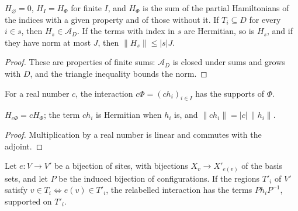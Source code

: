 \begin{lemma}
    \label{lem:dynamics_partial_hamiltonian}
    \leanok
    $H_\varnothing=0$, $H_I=H_\Phi$ for finite $I$, and $H_\Phi$ is the sum of the
    partial Hamiltonians of the indices with a given property and of those without it.
    If $T_i\subseteq D$ for every $i\in s$, then $H_s\in\mathcal A_D$. If the terms
    with index in $s$ are Hermitian, so is $H_s$, and if they have norm at most $J$,
    then $\lVert H_s\rVert\le\lvert s\rvert J$.
\end{lemma}
\begin{proof}
    \leanok
    These are properties of finite sums: $\mathcal A_D$ is closed under sums and grows
    with $D$, and the triangle inequality bounds the norm.
\end{proof}

\begin{definition}
    \label{def:dynamics_interaction_smul}
    \leanok
    For a real number $c$, the interaction $c\Phi=(ch_i)_{i\in I}$ has the supports of
    $\Phi$.
\end{definition}

\begin{lemma}
    \label{lem:dynamics_interaction_smul}
    \leanok
    $H_{c\Phi}=cH_\Phi$; the term $ch_i$ is Hermitian when $h_i$ is, and
    $\lVert ch_i\rVert=\lvert c\rvert\,\lVert h_i\rVert$.
\end{lemma}
\begin{proof}
    \leanok
    Multiplication by a real number is linear and commutes with the adjoint.
\end{proof}

\begin{definition}
    \label{def:dynamics_interaction_relabel}
    \leanok
    Let $e\colon V\to V'$ be a bijection of sites, with bijections $X_v\to X'_{e(v)}$
    of the basis sets, and let $P$ be the induced bijection of configurations. If the
    regions $T'_i$ of $V'$ satisfy $v\in T_i\iff e(v)\in T'_i$, the relabelled
    interaction has the terms $Ph_iP^{-1}$, supported on $T'_i$.
\end{definition}

